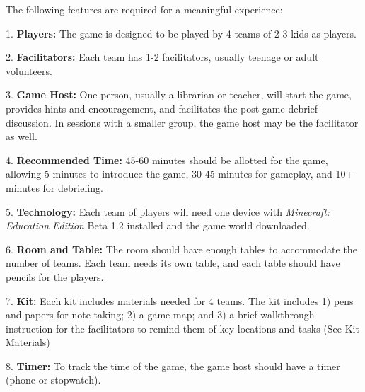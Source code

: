 The following features are required for a meaningful experience: 

1. \textbf{Players:} The game is designed to be played by 4 teams of 2-3 kids as players.

2. \textbf{Facilitators:} Each team has 1-2 facilitators, usually teenage or adult volunteers.

3. \textbf{Game Host:} One person, usually a librarian or teacher, will start the game, provides hints and encouragement, and facilitates the post-game debrief discussion. In sessions with a smaller group, the game host may be the facilitator as well.

4.	\textbf{Recommended Time:} 45-60 minutes should be allotted for the game, allowing 5 minutes to introduce the game, 30-45 minutes for gameplay, and 10+ minutes for debriefing. 

5.	\textbf{Technology:} Each team of players will need one device with \textit{Minecraft: Education Edition} Beta 1.2 installed and the game world downloaded. 

6. \textbf{Room and Table:} The room should have enough tables to accommodate the number of teams. Each team needs its own table, and each table should have pencils for the players.

7. \textbf{Kit:} Each kit includes materials needed for 4 teams. The kit includes 1) pens and papers for note taking; 2) a game map; and 3) a brief walkthrough instruction for the facilitators to remind them of key locations and tasks (See Kit Materials)

8. \textbf{Timer:} To track the time of the game, the game host should have a timer (phone or stopwatch). 
